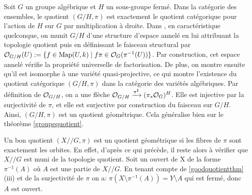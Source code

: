 \begin{ex}\label{groupQuotientGeometrique}
Soit $G$ un groupe algébrique et $H$ un sous-groupe fermé. Dans la catégorie des ensembles, le quotient $(G/H,\pi)$ est exactement le quotient catégorique pour l'action de $H$ sur $G$ par multiplication à droite. Dans \cite[5.5.5]{LAGSpringer}, en caractéristique quelconque, on munit $G/H$ d'une structure d'espace annelé en lui attribuant la topologie quotient puis en définissant le faisceau structural par $\mathcal{O}_{G/H}(U):=\lbrace f\in\textrm{Map}(U,k)\mid f\pi \in \mathcal{O}_G(\pi^{-1}(U))\rbrace$. Par construction, cet espace annelé vérifie la propriété universelle de factorisation. De plus, on montre ensuite qu'il est isomorphe à une variété quasi-projective, ce qui montre l'existence du quotient catégorique $(G/H,\pi)$ dans la catégorie des variétés algébriques. Par définition de $\mathcal{O}_{G/H}$, on a une flèche $\mathcal{O}_{G/H} \xrightarrow{\pi^\sharp} (\pi_*\mathcal{O}_G)^H$. Elle est injective par la surjectivité de $\pi$, et elle est surjective par construction du faisceau sur $G/H$. Ainsi, $(G/H,\pi)$ est un quotient géométrique. Cela généralise bien sur le théorème \ref{groupequotient}.
\end{ex}

\begin{ex}
Un bon quotient $(X//G, \pi)$ est un quotient géométrique si les fibres de $\pi$ sont exactement les orbites. En effet, d'après ce qui précède, il reste alors à vérifier que $X//G$ est muni de la topologie quotient. Soit un ouvert de X de la forme $\pi^{-1}(A)$ où $A$ est une partie de $X//G$. En tenant compte de \ref{goodquotientthm} (iii) et de la surjectivité de $\pi$ on a: $\pi(X\setminus \pi^{-1}(A))=Y\setminus A$ qui est fermé, donc $A$ est ouvert.
\end{ex}

